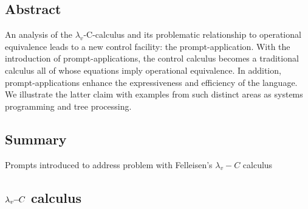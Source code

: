 \documentclass[letterpaper]{llncs}
\begin{document}
\subsection*{Abstract}
An analysis of the $\lambda_v$-C-calculus and its problematic relationship to operational equivalence leads to a new control facility: the prompt-application. With the introduction of prompt-applications, the control calculus becomes a traditional calculus all of whose equations imply operational equivalence. In addition, prompt-applications enhance the expressiveness and efficiency of the language. We illustrate the latter claim with examples from such distinct areas as systems programming and tree processing.

\subsection*{Summary}

Prompts introduced to address problem with Felleisen's $\lambda_v\!\!-\!\!C$ calculus~\cite{Felleisen1987SyntacticTheory}
	
\subsection*{$ \lambda_v\!\!-\!\!C $ calculus}
\end{document}

